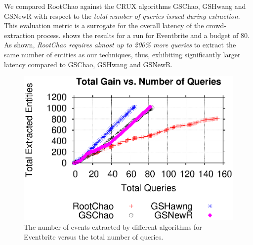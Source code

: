 We compared RootChao against the CRUX algorithms GSChao, GSHwang and GSNewR with respect to the {\em total number of queries issued during extraction}. This evaluation metric is a surrogate for the overall latency of the crowd-extraction process.  shows the results for a run for Eventbrite and a budget of 80. As shown, {\em RootChao requires almost up to 200\% more queries} to extract the same number of entities as our techniques, thus, exhibiting significantly larger latency compared to GSChao, GSHwang and GSNewR.

\begin{figure}[t]
\vspace{-10pt}
	\begin{center}
	\includegraphics[clip,scale=0.4]{figs/gain_rounds.eps}
	\vspace{-10pt}
	\caption{The number of events extracted by different algorithms for Eventbrite versus the total number of queries.}
	\label{fig:rounds}
	\end{center}
	\vspace{-10pt}
\end{figure}

